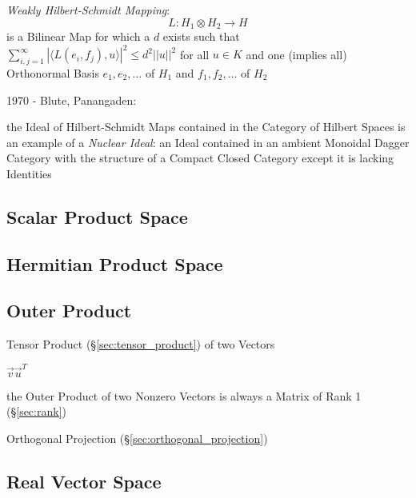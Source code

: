 \emph{Weakly Hilbert-Schmidt Mapping}:
\[
  L : H_1 \otimes H_2 \rightarrow H
\]
is a Bilinear Map for which a $d$ exists such that
$\sum_{i,j=1}^\infty | \langle L(e_i,f_j), u \rangle |^2 \leq d^2
||u||^2$ for all $u \in K$ and one (implies all) Orthonormal Basis
$e_1, e_2, \ldots$ of $H_1$ and $f_1, f_2, \ldots$ of $H_2$


1970 - Blute, Panangaden:

the Ideal of Hilbert-Schmidt Maps contained in the Category of Hilbert
Spaces is an example of a \emph{Nuclear Ideal}: an Ideal contained in
an ambient Monoidal Dagger Category with the structure of a Compact
Closed Category except it is lacking Identities



\subsection{Scalar Product Space}\label{sec:scalar_product_space}

\subsection{Hermitian Product Space}\label{sec:hermitian_product_space}

\subsection{Outer Product}\label{sec:outer_product}

Tensor Product (\S\ref{sec:tensor_product}) of two Vectors

$\vec{v}\vec{u}^T$

the Outer Product of two Nonzero Vectors is always a Matrix of Rank 1
(\S\ref{sec:rank})

\fist Orthogonal Projection (\S\ref{sec:orthogonal_projection})



\subsection{Real Vector Space}\label{sec:real_vector_space}

